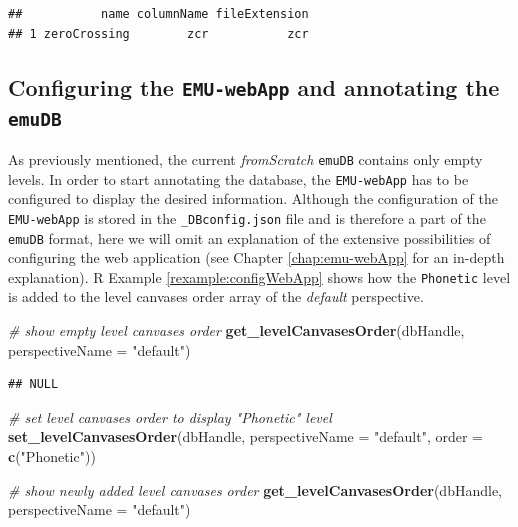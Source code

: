 \documentclass[]{book}
\newenvironment{Shaded}{\begin{snugshade}}{\end{snugshade}}
\newcommand{\CommentTok}[1]{\textcolor[rgb]{0.56,0.35,0.01}{\textit{#1}}}
\newcommand{\DataTypeTok}[1]{\textcolor[rgb]{0.13,0.29,0.53}{#1}}
\newcommand{\KeywordTok}[1]{\textcolor[rgb]{0.13,0.29,0.53}{\textbf{#1}}}
\newcommand{\NormalTok}[1]{#1}
\newcommand{\StringTok}[1]{\textcolor[rgb]{0.31,0.60,0.02}{#1}}
\theoremstyle{definition}
\theoremstyle{definition}
\theoremstyle{definition}
\theoremstyle{remark}
\begin{document}
\begin{verbatim}
##           name columnName fileExtension
## 1 zeroCrossing        zcr           zcr
\end{verbatim}

\hypertarget{configuring-the-emu-webapp-and-annotating-the-emudb}{%
\subsection{\texorpdfstring{Configuring the \texttt{EMU-webApp} and
annotating the
\texttt{emuDB}}{Configuring the EMU-webApp and annotating the emuDB}}\label{configuring-the-emu-webapp-and-annotating-the-emudb}}

As previously mentioned, the current \emph{fromScratch} \texttt{emuDB}
contains only empty levels. In order to start annotating the database,
the \texttt{EMU-webApp} has to be configured to display the desired
information. Although the configuration of the \texttt{EMU-webApp} is
stored in the \texttt{\_DBconfig.json} file and is therefore a part of
the \texttt{emuDB} format, here we will omit an explanation of the
extensive possibilities of configuring the web application (see Chapter
\ref{chap:emu-webApp} for an in-depth explanation). R Example
\ref{rexample:configWebApp} shows how the \texttt{Phonetic} level is
added to the level canvases order array of the \emph{default}
perspective.

\begin{Shaded}
\begin{Highlighting}[]
\CommentTok{# show empty level canvases order}
\KeywordTok{get_levelCanvasesOrder}\NormalTok{(dbHandle, }\DataTypeTok{perspectiveName =} \StringTok{"default"}\NormalTok{)}
\end{Highlighting}
\end{Shaded}

\begin{verbatim}
## NULL
\end{verbatim}

\begin{Shaded}
\begin{Highlighting}[]
\CommentTok{# set level canvases order to display "Phonetic" level}
\KeywordTok{set_levelCanvasesOrder}\NormalTok{(dbHandle,}
                       \DataTypeTok{perspectiveName =} \StringTok{"default"}\NormalTok{,}
                       \DataTypeTok{order =} \KeywordTok{c}\NormalTok{(}\StringTok{"Phonetic"}\NormalTok{))}

\CommentTok{# show newly added level canvases order}
\KeywordTok{get_levelCanvasesOrder}\NormalTok{(dbHandle, }\DataTypeTok{perspectiveName =} \StringTok{"default"}\NormalTok{)}
\end{Highlighting}
\end{Shaded}
\end{document}

